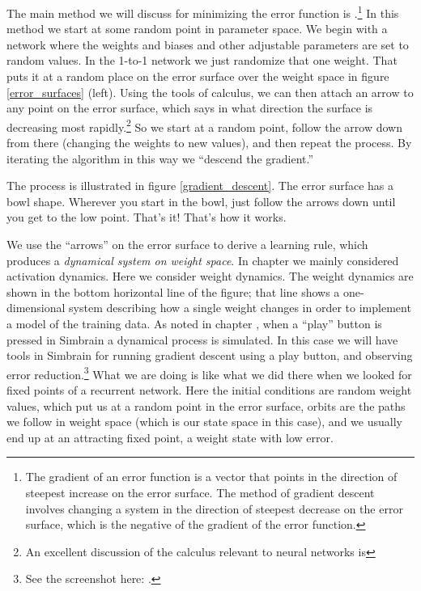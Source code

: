 The main method we will discuss for minimizing the error function is  .\footnote{The gradient of an error function is a vector that points in the direction of steepest increase on the error surface. The method of gradient descent involves changing a system in the direction of steepest decrease on the error surface, which is the negative of the gradient of the error function.}  In this method we start at some random point in parameter space. We begin with a network where the weights and biases and other adjustable parameters are set to random values. In the 1-to-1 network we just randomize that one weight. That puts it at a random place on the error surface over the weight space in figure \ref{error_surfaces} (left). Using the tools of calculus, we can then attach an arrow to any point on the error surface, which says in what direction the surface is decreasing most rapidly.\footnote{An excellent discussion of the calculus relevant to neural networks is } So we start at a random point, follow the arrow down from there (changing the weights to new values), and then repeat the process. By iterating the algorithm in this way we ``descend the gradient.''

The process is illustrated in figure \ref{gradient_descent}. The error surface has a bowl shape. Wherever you start in the bowl, just follow the arrows down until you get to the low point. That's it!  That's how it works.

We use the ``arrows'' on the error surface to derive a learning rule, which produces a \emph{dynamical system on weight space}. In chapter  we mainly considered activation dynamics. Here we consider weight dynamics. The weight dynamics are shown in the bottom horizontal line of the figure; that line shows a one-dimensional system describing how a single weight changes in order to implement a model of the training data. As noted in chapter , when a ``play''  button  is pressed in Simbrain  a dynamical process is simulated. In this case we will have tools in Simbrain for running gradient descent using a play button, and observing error reduction.\footnote{See the screenshot here: .} What we are doing is like what we did there when we looked for fixed points of a recurrent network. Here the initial conditions are random weight values, which put us at a random point in the error surface, orbits are the paths we follow in weight space (which is our state space in this case), and we usually end up  at an attracting fixed point, a weight state with low error.


